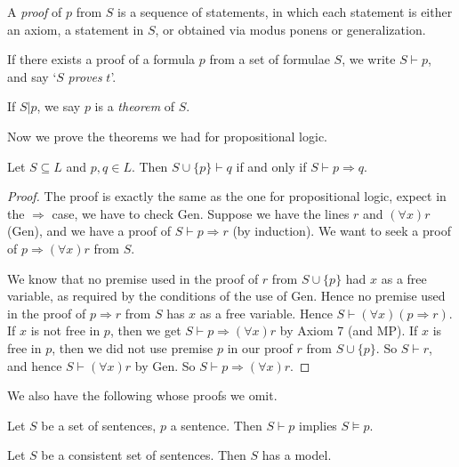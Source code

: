 \documentclass[a3paper, 10pt]{article}
\renewcommand{\vocab}[1]{\emph{#1}}
\begin{document}
\begin{multicols*}{5}
\begin{definition}[Proof]
  A \vocab{proof} of $p$ from $S$ is a sequence of statements, in which each statement is either an axiom, a statement in $S$, or obtained via modus ponens or generalization.
\end{definition}

\begin{definition}
  If there exists a proof of a formula $p$ from a set of formulae $S$, we write $S \vdash p$, and say `$S$ \vocab{proves} $t$'.
\end{definition}

\begin{definition}[Theorem]
  If $S \lvert p$, we say $p$ is a \vocab{theorem} of $S$.  
\end{definition}

Now we prove the theorems we had for propositional logic.

\begin{proposition}
  Let $S \subseteq L$ and $p, q \in L$. Then $S \cup \{p\} \vdash q$ if and only if $S \vdash p \Rightarrow q$.
\end{proposition}
\begin{proof}
  The proof is exactly the same as the one for propositional logic, expect in the $\Rightarrow$ case, we have to check Gen. Suppose we have the lines $r$ and $(\forall x) r$ (Gen), and we have a proof of $S\vdash p \Rightarrow r$ (by induction). We want to seek a proof of $p \Rightarrow (\forall x) r$ from $S$.

  We know that no premise used in the proof of $r$ from $S \cup \{p\}$ had $x$ as a free variable, as required by the conditions of the use of Gen. Hence no premise used in the proof of $p\Rightarrow r$ from $S$ has $x$ as a free variable. Hence $S \vdash (\forall x)(p\Rightarrow r)$. If $x$ is not free in $p$, then we get $S \vdash p \Rightarrow (\forall x)r$ by Axiom 7 (and MP). If $x$ is free in $p$, then we did not use premise $p$ in our proof $r$ from $S \cup \{p\}$. So $S \vdash r$, and hence $S \vdash (\forall x) r$ by Gen. So $S \vdash p \Rightarrow (\forall x) r$.
\end{proof}


We also have the following whose proofs we omit.

\begin{proposition}
  Let $S$ be a set of sentences, $p$ a sentence. Then $S \vdash p$ implies $S \models p$.
\end{proposition}
\begin{theorem}
  Let $S$ be a consistent set of sentences. Then $S$ has a model.
\end{theorem}


\end{multicols*}
\end{document}

